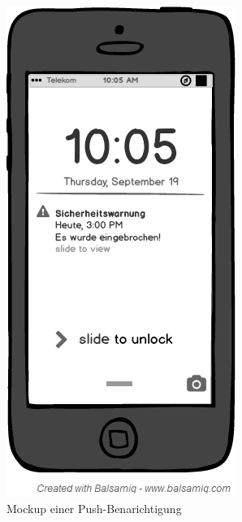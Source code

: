 \begin{figure}[H] 
	\centering
	\includegraphics[scale=0.5]{Bilder/alert}
	\caption{Mockup einer Push-Benarichtigung}
	\label{f:alert}
\end{figure}
